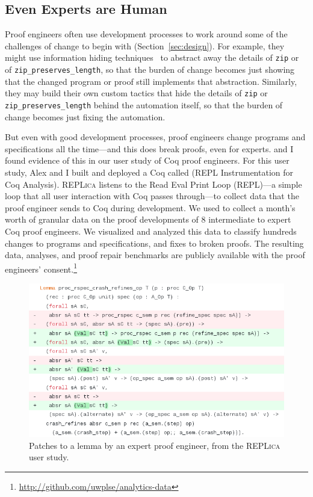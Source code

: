 \subsection{Even Experts are Human}
\label{sec:irl}

Proof engineers often use development processes to work around some of the challenges of change to begin with (Section~\ref{sec:design}).
For example, they might use information hiding techniques~\cite{Woos:2016:PCF:2854065.2854081, Klein2014}
to abstract away the details of \lstinline{zip} or of \lstinline{zip_preserves_length},
so that the burden of change becomes just showing that the changed program or proof still implements that abstraction.
Similarly, they may build their own custom tactics that hide the details of
\lstinline{zip} or \lstinline{zip_preserves_length} behind the automation itself,
so that the burden of change becomes just fixing the automation.
 
But even with good development processes, proof engineers change programs and specifications all the time---and this does break proofs, 
even for experts.
 and I found evidence of this in our user study of Coq proof engineers.
For this user study, Alex and I built and deployed a Coq  called 
(REPL Instrumentation for Coq Analysis). \textsc{REPLica} listens to the Read Eval Print
Loop (REPL)---a simple loop that all user interaction with Coq passes through---to collect data that the proof engineer sends to Coq during development.
We used \toolname to collect a month's worth of granular data on 
the proof developments of 8 intermediate to expert Coq proof engineers.
We visualized and analyzed this data to classify hundreds changes to programs and specifications,
and fixes to broken proofs.
The resulting data, analyses, and proof repair benchmarks are publicly available with the proof engineers' 
consent.\footnote{\url{http://github.com/uwplse/analytics-data}}

\begin{figure}
  \includegraphics[width=1.0\textwidth]{maintenance/fig/patch.png}
  \caption{Patches to a lemma by an expert proof engineer, from the \textsc{REPLica} user study.}
  \label{fig:patch}
\end{figure}

